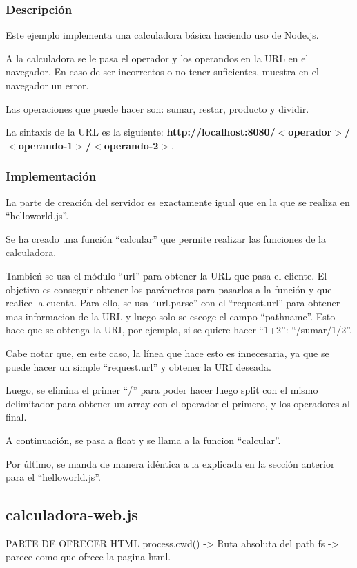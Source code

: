 \documentclass{article}
\begin{document}
\subsubsection{Descripción}
Este ejemplo implementa una calculadora básica haciendo uso de Node.js. 

A la calculadora se le pasa el operador y los operandos en la URL en el navegador. En caso de ser incorrectos o no tener suficientes, muestra en el navegador un error.

Las operaciones que puede hacer son: sumar, restar, producto y dividir.

La sintaxis de la URL es la siguiente: \textbf{http://localhost:8080/$<$operador$>$/$<$operando-1$>$/$<$operando-2$>$}.



\subsubsection{Implementación}
La parte de creación del servidor es exactamente igual que en la que se realiza en ``helloworld.js''.

Se ha creado una función ``calcular'' que permite realizar las funciones de la calculadora.

Tambień se usa el módulo ``url'' para obtener la URL que pasa el cliente. El objetivo es conseguir obtener los parámetros para pasarlos a la función y que realice la cuenta. Para ello, se usa ``url.parse'' con el ``request.url'' para obtener mas informacion de la URL y luego solo se escoge el campo ``pathname''. Esto hace que se obtenga la URI, por ejemplo, si se quiere hacer ``1+2'': ``/sumar/1/2''.

Cabe notar que, en este caso, la línea que hace esto es innecesaria, ya que se puede hacer un simple ``request.url'' y obtener la URI deseada.


Luego, se elimina el primer ``/'' para poder hacer luego split con el mismo delimitador para obtener un array con el operador el primero, y los operadores al final.

A continuación, se pasa a float y se llama a la funcion ``calcular''.

Por último, se manda de manera idéntica a la explicada en la sección anterior para el ``helloworld.js''.


\subsection{calculadora-web.js}
PARTE DE OFRECER HTML
process.cwd() -> Ruta absoluta del path
fs -> parece como que ofrece la pagina html.
\end{document}
